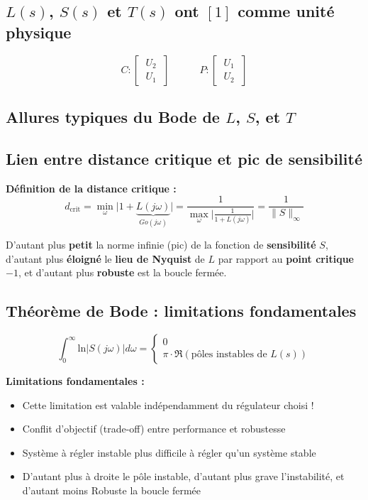 \documentclass[document.tex]{subfiles}
\begin{document}
\subsection{$L(s)$, $S(s)$ et $T(s)$ ont $[1]$ comme unité physique}


$$ C : \begin{bmatrix} \; U_2 \; \\ \hline \; U_1 \; \end{bmatrix} \quad \quad \quad P : \begin{bmatrix} \; U_1 \; \\ \hline \; U_2 \; \end{bmatrix} $$

\subsection{Allures typiques du Bode de $L$, $S$, et $T$}


\subsection{Lien entre distance critique et pic de sensibilité}


\textbf{Définition de la distance critique : }
$$
\boxed{d_{\text{crit}}= \min_\omega \vert 1 + \underbrace{L(j\omega)}_{Go(j\omega)} \vert = \dfrac{1}{\max_\omega \vert \frac{1}{1 + L(j\omega)} \vert}= \dfrac{1}{\parallel S \parallel_\infty}}
$$

D'autant plus \textbf{petit} la norme infinie (pic) de la fonction de \textbf{sensibilité} $S$, d'autant plus \textbf{éloigné} le \textbf{lieu de Nyquist} de $L$ par rapport au \textbf{point critique} $-1$, et d'autant plus \textbf{robuste} est la boucle fermée.

\subsection{Théorème de Bode : limitations fondamentales}

$$ \boxed{\int_0^\infty \text{ln} \vert S(j\omega) \vert d\omega = \begin{cases} 0 \\ \pi \cdot \Re(\text{pôles instables de } L(s)) \end{cases}} $$

\textbf{Limitations fondamentales :}
\begin{itemize}
\item Cette limitation est valable indépendamment du régulateur choisi  !
\item Conflit d'objectif (trade-off) entre performance et robustesse
\item Système à régler instable plus difficile à régler qu'un système stable
\item D'autant plus à droite le pôle instable, d'autant plus grave l'instabilité, et d'autant moins Robuste la boucle fermée
\end{itemize}
\end{document}
